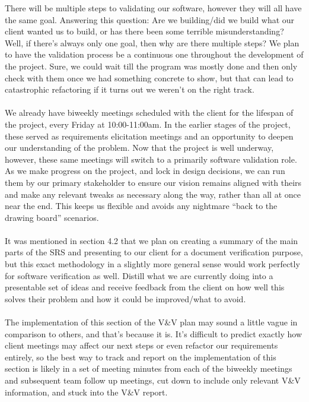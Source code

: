 \documentclass[12pt, titlepage]{article}
\begin{document}
There will be multiple steps to validating our software, however they will all have the same goal. Answering this question:  Are we building/did we build what our client wanted
us to build, or has there been some terrible misunderstanding? Well, if there’s always only one goal, then why are there multiple steps? We plan to have the validation
process be a continuous one throughout the development of the project. Sure, we could wait till the program was mostly done and then only check with them once we had 
something concrete to show, but that can lead to catastrophic refactoring if it turns out we weren’t on the right track.\\\\ We already have biweekly meetings
scheduled with the client for the lifespan of the project, every Friday at 10:00-11:00am. In the earlier stages of the project, these served as requirements elicitation
meetings and an opportunity to deepen our understanding of the problem. Now that the project is well underway, however, these same meetings will switch to a primarily software
validation role. As we make progress on the project, and lock in design decisions, we can run them by our primary stakeholder to ensure our vision remains aligned with theirs
and make any relevant tweaks as necessary along the way, rather than all at once near the end. This keeps us flexible and avoids any nightmare “back to the drawing board” 
scenarios.\\\\ It was mentioned in section 4.2 that we plan on creating a summary of the main parts of the SRS and presenting to our client for a document verification purpose,
but this exact methodology in a slightly more general sense would work perfectly for software verification as well. Distill what we are currently doing into a presentable
set of ideas and receive feedback from the client on how well this solves their problem and how it could be improved/what to avoid.\\\\ The implementation of this
section of the V\&V plan may sound a little vague in comparison to others, and that’s because it is. It’s difficult to predict exactly how client meetings may affect our
next steps or even refactor our requirements entirely, so the best way to track and report on the implementation of this section is likely in a set of meeting minutes
from each of the biweekly meetings and subsequent team follow up meetings, cut down to include only relevant V\&V information, and stuck into the V\&V report.
\end{document}
